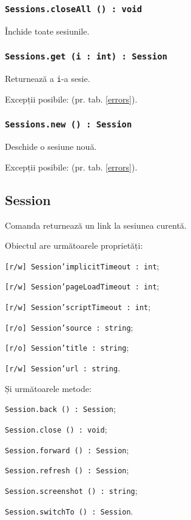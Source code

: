 \subsubsection{\texttt{Sessions.closeAll () : void}}

Închide toate sesiunile.

\subsubsection{\texttt{Sessions.get (i : int) : Session}}

Returnează a \texttt{i}-a sesie.

Excepții posibile:  (pr. tab. \ref{errors}).

\subsubsection{\texttt{Sessions.new () : Session}}

Deschide o sesiune nouă.

Excepții posibile:  (pr. tab. \ref{errors}).

\subsection{{\color{orange} Session}}

Comanda \session{} returnează un link la sesiunea curentă.

Obiectul \session{} are următoarele proprietăți:
\begin{icItems}
	\item \texttt{[r/w] Session'implicitTimeout : int};
	\item \texttt{[r/w] Session'pageLoadTimeout : int};
	\item \texttt{[r/w] Session'scriptTimeout : int};
	\item \texttt{[r/o] Session'source : string};
	\item \texttt{[r/o] Session'title : string};
	\item \texttt{[r/w] Session'url : string}.
\end{icItems}

Și următoarele metode:
\begin{icItems}
	\item \texttt{Session.back () : Session};
	\item \texttt{Session.close () : void};
	\item \texttt{Session.forward () : Session};
	\item \texttt{Session.refresh () : Session};
	\item \texttt{Session.screenshot () : string};
	\item \texttt{Session.switchTo () : Session}.
\end{icItems}

